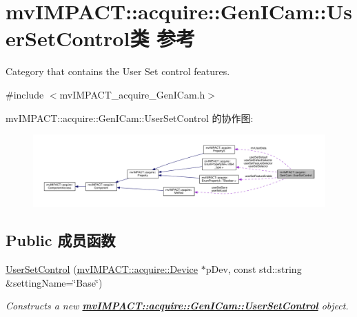 \hypertarget{classmv_i_m_p_a_c_t_1_1acquire_1_1_gen_i_cam_1_1_user_set_control}{\section{mv\+I\+M\+P\+A\+C\+T\+:\+:acquire\+:\+:Gen\+I\+Cam\+:\+:User\+Set\+Control类 参考}
\label{classmv_i_m_p_a_c_t_1_1acquire_1_1_gen_i_cam_1_1_user_set_control}
}


Category that contains the User Set control features.  




{\ttfamily \#include $<$mv\+I\+M\+P\+A\+C\+T\+\_\+acquire\+\_\+\+Gen\+I\+Cam.\+h$>$}



mv\+I\+M\+P\+A\+C\+T\+:\+:acquire\+:\+:Gen\+I\+Cam\+:\+:User\+Set\+Control 的协作图\+:
\nopagebreak
\begin{figure}[H]
\begin{center}
\leavevmode
\includegraphics[width=350pt]{classmv_i_m_p_a_c_t_1_1acquire_1_1_gen_i_cam_1_1_user_set_control__coll__graph}
\end{center}
\end{figure}
\subsection*{Public 成员函数}
\begin{DoxyCompactItemize}
\item 
\hyperlink{classmv_i_m_p_a_c_t_1_1acquire_1_1_gen_i_cam_1_1_user_set_control_a1a339e0bc4f721897a7e832c87695810}{User\+Set\+Control} (\hyperlink{classmv_i_m_p_a_c_t_1_1acquire_1_1_device}{mv\+I\+M\+P\+A\+C\+T\+::acquire\+::\+Device} $\ast$p\+Dev, const std\+::string \&setting\+Name=\char`\"{}Base\char`\"{})
\begin{DoxyCompactList}\small\item\em Constructs a new {\bfseries \hyperlink{classmv_i_m_p_a_c_t_1_1acquire_1_1_gen_i_cam_1_1_user_set_control}{mv\+I\+M\+P\+A\+C\+T\+::acquire\+::\+Gen\+I\+Cam\+::\+User\+Set\+Control}} object. \end{DoxyCompactList}\end{DoxyCompactItemize}
